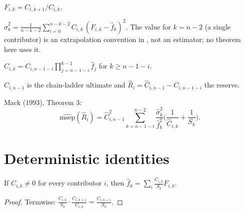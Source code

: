 \begin{definition}\label{def:F}\leanok
$F_{i,k} = C_{i,k+1} / C_{i,k}$.
\end{definition}

\begin{definition}\label{def:sigma2}\leanok
{}
$\hat\sigma_k^2 = \frac{1}{n-k-2}\sum_{i=0}^{n-k-2} C_{i,k}\,(F_{i,k} - \hat f_k)^2$.
The value for $k = n-2$ (a single contributor) is an extrapolation convention in
\cite{Mack1993}, not an estimator; no theorem here uses it.
\end{definition}

\begin{definition}[Projection]\label{def:Chat}\leanok
{}
$\hat C_{i,k} = C_{i,n-1-i} \prod_{j=n-1-i}^{k-1} \hat f_j$ for $k \ge n-1-i$.
\end{definition}

\begin{definition}\label{def:reserve}\leanok
{}
$\hat C_{i,n-1}$ is the chain-ladder ultimate and $\hat R_i = \hat C_{i,n-1} - C_{i,n-1-i}$ the reserve.
\end{definition}

\begin{definition}\label{def:msep}\leanok
{}
Mack (1993), Theorem 3:
\[
\widehat{\mathrm{msep}}(\hat R_i)
 = \hat C_{i,n-1}^2 \sum_{k=n-1-i}^{n-2} \frac{\hat\sigma_k^2}{\hat f_k^2}
   \Big(\frac{1}{\hat C_{i,k}} + \frac{1}{S_k}\Big).
\]
\end{definition}

\section{Deterministic identities}

\begin{lemma}\label{lem:weighted}\leanok
{}
If $C_{i,k} \neq 0$ for every contributor $i$, then
$\hat f_k = \sum_{i} \frac{C_{i,k}}{S_k} F_{i,k}$.
\end{lemma}
\begin{proof}\leanok Termwise: $\frac{C_{i,k}}{S_k}\cdot\frac{C_{i,k+1}}{C_{i,k}} = \frac{C_{i,k+1}}{S_k}$. \end{proof}

